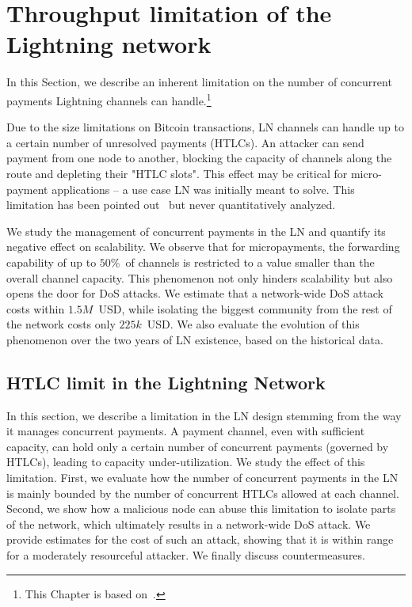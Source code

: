\chapter{Throughput limitation of the Lightning network}

\label{Chapter08HTLClimit}

In this Section, we describe an inherent limitation on the number of concurrent payments Lightning channels can handle.\footnote{This Chapter is based on~\cite{Tikhomirov2020a}.}

Due to the size limitations on Bitcoin transactions, LN channels can handle up to a certain number of unresolved payments (HTLCs).
An attacker can send payment from one node to another, blocking the capacity of channels along the route and depleting their "HTLC slots".
This effect may be critical for micro-payment applications -- a use case LN was initially meant to solve.
This limitation has been pointed out~\cite{EmelyanenkoK2017} but never quantitatively analyzed.

We study the management of concurrent payments in the LN and quantify its negative effect on scalability.
We observe that for micropayments, the forwarding capability of up to $50\%$~of channels is restricted to a value smaller than the overall channel capacity.
This phenomenon not only hinders scalability but also opens the door for DoS attacks.
We estimate that a network-wide DoS attack costs within $1.5M$~USD, while isolating the biggest community from the rest of the network costs only $225k$~USD.
We also evaluate the evolution of this phenomenon over the two years of LN existence, based on the historical data.


\section{HTLC limit in the Lightning Network}
\label{sec:attack}

In this section, we describe a limitation in the LN design stemming from the way it manages concurrent payments.
A payment channel, even with sufficient capacity, can hold only a certain number of concurrent payments (governed by HTLCs), leading to capacity under-utilization.
We study the effect of this limitation.
First, we evaluate how the number of concurrent payments in the LN is mainly bounded by the number of concurrent HTLCs allowed at each channel.
Second, we show how a malicious node can abuse this limitation to isolate parts of the network, which ultimately results in a network-wide DoS attack.
We provide estimates for the cost of such an attack, showing that it is within range for a moderately resourceful attacker.
We finally discuss countermeasures.


